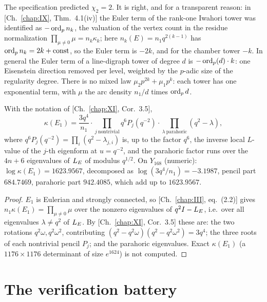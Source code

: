 \begin{remark}\label{XII:rem:chi2}
The specification predicted $\chi_2=2$. It is right, and for a transparent reason: in
[Ch.~\ref{chap:IX}, Thm.~4.1(iv)] the Euler term of the rank-one Iwahori tower was identified as
$-\operatorname{ord}_p n_k$, the valuation of the vertex count in the residue normalization
$\prod_{\mu\ne0}\mu=n_k\kappa_k$; here $n_k(E)=n_1q^{2(k-1)}$ has $\operatorname{ord}_pn_k=2k+\mathrm{const}$,
so the Euler term is $-2k$, and for the chamber tower $-k$. In general the Euler term of a
line-digraph tower of degree $d$ is $-\operatorname{ord}_p(d)\cdot k$: one Eisenstein direction removed per
level, weighted by the $p$-adic size of the regularity degree. There is no mixed law
$\mu_2p^{2k}+\mu_1p^{k}$: each tower has one exponential term, with $\mu$ the arc density
$n_1/d$ times $\operatorname{ord}_p d$.
\end{remark}

\begin{proposition}\label{XII:prop:kappaE1}
With the notation of {\rm[Ch.~\ref{chap:XI}, Cor.~3.5]},
\[
\kappa(E_1)=\frac{3q^{4}}{n_1}\cdot\prod_{j\ \mathrm{nontrivial}}q^{6}P_j(q^{-2})\cdot
\prod_{\lambda\ \mathrm{parahoric}}(q^{2}-\lambda),
\]
where $q^{6}P_j(q^{-2})=\prod_i(q^{2}-\lambda_{j,i})$ is, up to the factor $q^{6}$, the inverse
local $L$-value of the $j$-th eigenform at $u=q^{-2}$, and the parahoric factor runs over
the $4n+6$ eigenvalues of $L_E$ of modulus $q^{1/2}$. On $Y_{168}$ (numeric):
$\log\kappa(E_1)=1623.9567$, decomposed as $\log(3q^{4}/n_1)=-3.1987$, pencil part
$684.7469$, parahoric part $942.4085$, which add up to $1623.9567$.
\end{proposition}

\begin{proof}
$E_1$ is Eulerian and strongly connected, so [Ch.~\ref{chap:III}, eq.~(2.2)] gives
$n_1\kappa(E_1)=\prod_{\mu\ne0}\mu$ over the nonzero eigenvalues of $q^{2}I-L_E$, i.e.\ over
all eigenvalues $\lambda\ne q^{2}$ of $L_E$. By [Ch.~\ref{chap:XI}, Cor.~3.5] these are: the two rotations
$q^{2}\omega,q^{2}\omega^{2}$, contributing $(q^{2}-q^{2}\omega)(q^{2}-q^{2}\omega^{2})=3q^{4}$;
the three roots of each nontrivial pencil $P_j$; and the parahoric eigenvalues. Exact
$\kappa(E_1)$ (a $1176\times1176$ determinant of size $e^{1624}$) is not computed.
\end{proof}

\section{The verification battery}\label{XII:sec:battery}

